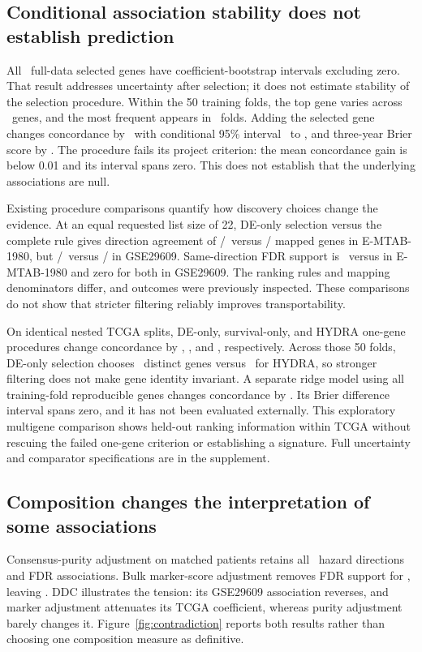 \documentclass{article}
\begin{document}
\subsection{Conditional association stability does not establish prediction}
All \HighGenes\ full-data selected genes have coefficient-bootstrap intervals excluding zero. That result addresses uncertainty after selection; it does not estimate stability of the selection procedure. Within the 50 training folds, the top gene varies across \NestedDistinctGenes\ genes, and the most frequent appears in \NestedTopGeneFolds\ folds. Adding the selected gene changes concordance by \NestedDelta\, with conditional 95\% interval \NestedCiLow\ to \NestedCiHigh, and three-year Brier score by \NestedBrierDelta. The procedure fails its project criterion: the mean concordance gain is below 0.01 and its interval spans zero. This does not establish that the underlying associations are null.

Existing procedure comparisons quantify how discovery choices change the evidence. At an equal requested list size of 22, DE-only selection versus the complete rule gives direction agreement of \ReviewEmDeSame/\ReviewEmDeMapped{}\ versus \ReviewEmCompleteSame/\ReviewEmCompleteMapped{} mapped genes in E-MTAB-1980, but \ReviewGseDeSame/\ReviewGseDeMapped{}\ versus \ReviewGseCompleteSame/\ReviewGseCompleteMapped{} in GSE29609. Same-direction FDR support is \ReviewEmDeFdr\ versus \ReviewEmCompleteFdr in E-MTAB-1980 and zero for both in GSE29609. The ranking rules and mapping denominators differ, and outcomes were previously inspected. These comparisons do not show that stricter filtering reliably improves transportability.

On identical nested TCGA splits, DE-only, survival-only, and HYDRA one-gene procedures change concordance by \BenchDeDelta, \BenchSurvivalDelta, and \BenchHydraDelta, respectively. Across those 50 folds, DE-only selection chooses \BenchDeGenes\ distinct genes versus \BenchHydraGenes\ for HYDRA, so stronger filtering does not make gene identity invariant. A separate ridge model using all training-fold reproducible genes changes concordance by \BenchRidgeDelta. Its Brier difference interval spans zero, and it has not been evaluated externally. This exploratory multigene comparison shows held-out ranking information within TCGA without rescuing the failed one-gene criterion or establishing a signature. Full uncertainty and comparator specifications are in the supplement.

\subsection{Composition changes the interpretation of some associations}
Consensus-purity adjustment on matched patients retains all \HighGenes\ hazard directions and FDR associations. Bulk marker-score adjustment removes FDR support for \CompositionFailures, leaving \ReviewMarkerRetained. DDC illustrates the tension: its GSE29609 association reverses, and marker adjustment attenuates its TCGA coefficient, whereas purity adjustment barely changes it. Figure~\ref{fig:contradiction} reports both results rather than choosing one composition measure as definitive.
\end{document}
